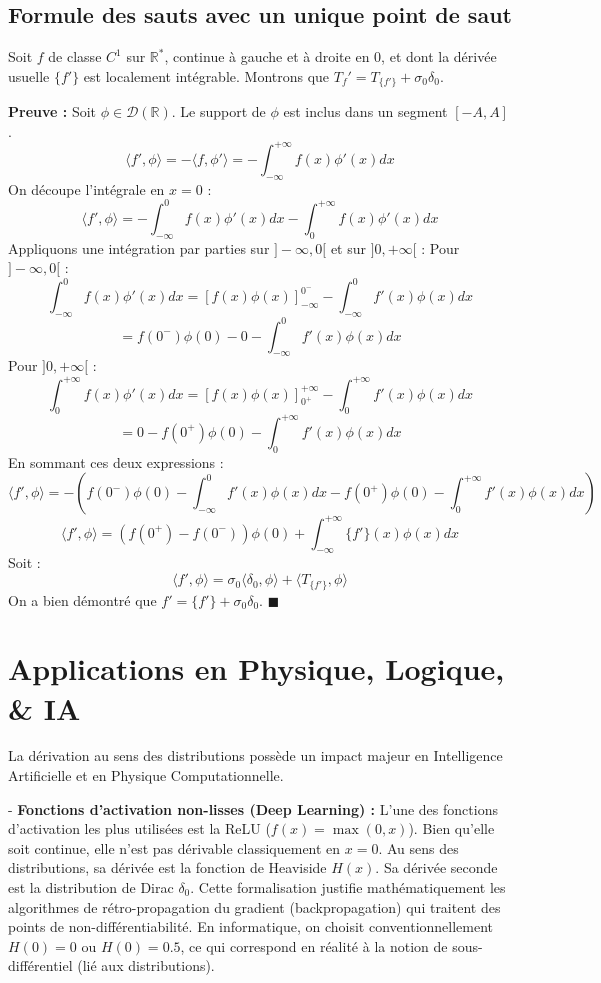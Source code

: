 \documentclass[11pt,a4paper]{article}
\begin{document}
\subsection{Formule des sauts avec un unique point de saut}

Soit $f$ de classe $C^1$ sur $\mathbb{R}^*$, continue à gauche et à droite en 0, et dont la dérivée usuelle $\{f'\}$ est localement intégrable. Montrons que $T_f' = T_{\{f'\}} + \sigma_0 \delta_0$.

\textbf{Preuve :}
Soit $\phi \in \mathcal{D}(\mathbb{R})$. Le support de $\phi$ est inclus dans un segment $[-A, A]$.
$$ \langle f', \phi \rangle = - \langle f, \phi' \rangle = - \int_{-\infty}^{+\infty} f(x) \phi'(x) dx $$
On découpe l'intégrale en $x=0$ :
$$ \langle f', \phi \rangle = - \int_{-\infty}^{0} f(x) \phi'(x) dx - \int_{0}^{+\infty} f(x) \phi'(x) dx $$
Appliquons une intégration par parties sur $]-\infty, 0[$ et sur $]0, +\infty[$ :
Pour $]-\infty, 0[$ :
$$ \int_{-\infty}^{0} f(x) \phi'(x) dx = [f(x)\phi(x)]_{-\infty}^{0^-} - \int_{-\infty}^{0} f'(x) \phi(x) dx $$
$$ = f(0^-)\phi(0) - 0 - \int_{-\infty}^{0} f'(x) \phi(x) dx $$
Pour $]0, +\infty[$ :
$$ \int_{0}^{+\infty} f(x) \phi'(x) dx = [f(x)\phi(x)]_{0^+}^{+\infty} - \int_{0}^{+\infty} f'(x) \phi(x) dx $$
$$ = 0 - f(0^+)\phi(0) - \int_{0}^{+\infty} f'(x) \phi(x) dx $$
En sommant ces deux expressions :
$$ \langle f', \phi \rangle = - \left( f(0^-)\phi(0) - \int_{-\infty}^{0} f'(x) \phi(x) dx - f(0^+)\phi(0) - \int_{0}^{+\infty} f'(x) \phi(x) dx \right) $$
$$ \langle f', \phi \rangle = \left( f(0^+) - f(0^-) \right)\phi(0) + \int_{-\infty}^{+\infty} \{f'\}(x) \phi(x) dx $$
Soit :
$$ \langle f', \phi \rangle = \sigma_0 \langle \delta_0, \phi \rangle + \langle T_{\{f'\}}, \phi \rangle $$
On a bien démontré que $f' = \{f'\} + \sigma_0 \delta_0$. $\blacksquare$

\section{Applications en Physique, Logique, \& IA}

La dérivation au sens des distributions possède un impact majeur en Intelligence Artificielle et en Physique Computationnelle.

- \textbf{Fonctions d'activation non-lisses (Deep Learning) :}
L'une des fonctions d'activation les plus utilisées est la ReLU ($f(x) = \max(0,x)$). Bien qu'elle soit continue, elle n'est pas dérivable classiquement en $x=0$. Au sens des distributions, sa dérivée est la fonction de Heaviside $H(x)$. Sa dérivée seconde est la distribution de Dirac $\delta_0$. Cette formalisation justifie mathématiquement les algorithmes de rétro-propagation du gradient (backpropagation) qui traitent des points de non-différentiabilité. En informatique, on choisit conventionnellement $H(0)=0$ ou $H(0)=0.5$, ce qui correspond en réalité à la notion de sous-différentiel (lié aux distributions).
\end{document}
